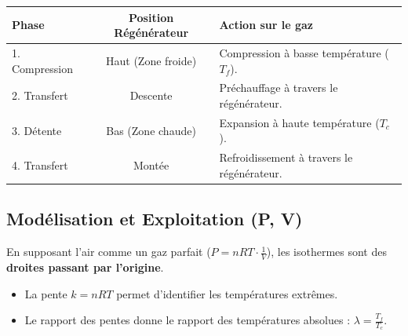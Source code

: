 \documentclass[french]{yLectureNote}
\begin{document}
\begin{table}[h!]
\centering
\begin{tabular}{|l|c|l|}
\hline
\textbf{Phase} & \textbf{Position Régénérateur} & \textbf{Action sur le gaz} \\ \hline
1. Compression & Haut (Zone froide) & Compression à basse température ($T_f$). \\ \hline
2. Transfert & Descente & Préchauffage à travers le régénérateur. \\ \hline
3. Détente & Bas (Zone chaude) & Expansion à haute température ($T_c$). \\ \hline
4. Transfert & Montée & Refroidissement à travers le régénérateur. \\ \hline
\end{tabular}
\end{table}


\subsection{Modélisation et Exploitation (P, V)}

\begin{proposition}[Diagramme (P, 1/V)]
En supposant l'air comme un gaz parfait ($P = nRT \cdot \frac{1}{V}$), les isothermes sont des \textbf{droites passant par l'origine}.
\begin{itemize}
    \item La pente $k = nRT$ permet d'identifier les températures extrêmes.
    \item Le rapport des pentes donne le rapport des températures absolues : $\lambda = \frac{T_f}{T_c}$.
\end{itemize}
\end{proposition}

\end{document}
